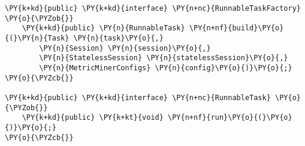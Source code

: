 \begin{Verbatim}[commandchars=\\\{\}]
\PY{k+kd}{public} \PY{k+kd}{interface} \PY{n+nc}{RunnableTaskFactory} \PY{o}{\PYZob{}}
    \PY{k+kd}{public} \PY{n}{RunnableTask} \PY{n+nf}{build}\PY{o}{(}\PY{n}{Task} \PY{n}{task}\PY{o}{,} 
        \PY{n}{Session} \PY{n}{session}\PY{o}{,} 
        \PY{n}{StatelessSession} \PY{n}{statelessSession}\PY{o}{,} 
        \PY{n}{MetricMinerConfigs} \PY{n}{config}\PY{o}{)}\PY{o}{;}
\PY{o}{\PYZcb{}}

\PY{k+kd}{public} \PY{k+kd}{interface} \PY{n+nc}{RunnableTask} \PY{o}{\PYZob{}}
    \PY{k+kd}{public} \PY{k+kt}{void} \PY{n+nf}{run}\PY{o}{(}\PY{o}{)}\PY{o}{;}
\PY{o}{\PYZcb{}}
\end{Verbatim}
